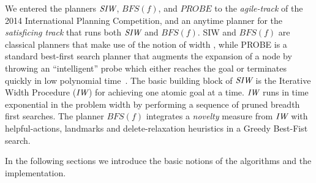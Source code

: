 
We entered the planners ${\textit{SIW}}$, $BFS(f)$, and $PROBE$ to the
\emph{agile-track} of the 2014 International Planning Competition, and an anytime
planner for the \emph{satisficing track} that runs both ${\textit{SIW}}$ and $BFS(f)$.
SIW and $BFS(f)$ are classical planners that make use of the notion of width \cite{nir:ecai12}, while PROBE is a standard best-first search planner that augments the expansion of a node by throwing an ``intelligent'' probe which
either reaches the goal or terminates quickly in low polynomial time~\cite{nir:icaps11}.
The basic building block of ${\textit{SIW}}$ is the Iterative Width Procedure
(${\textit{IW}}$) for achieving one atomic goal at a time. ${\textit{IW}}$ runs in time exponential in
the problem width by performing a sequence of pruned breadth first
searches.  The planner $BFS(f)$ integrates a \emph{novelty} measure
from ${\textit{IW}}$ with helpful-actions, landmarks and
delete-relaxation heuristics in a Greedy Best-Fist
search.  

In the following sections we introduce the basic notions of the
algorithms and the implementation. 
